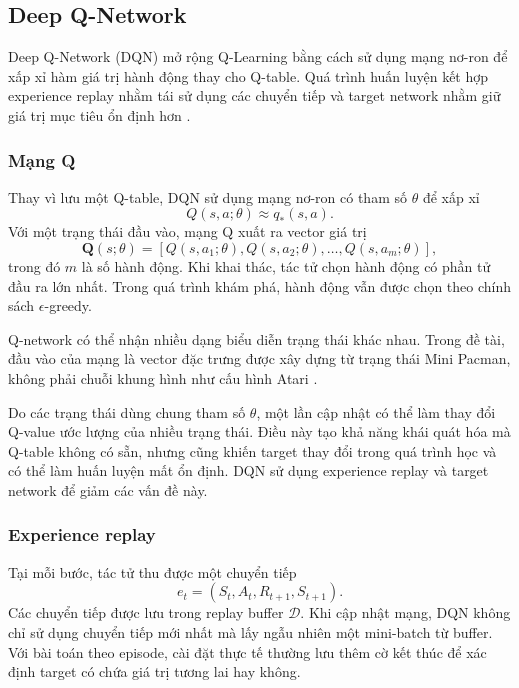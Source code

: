 \subsection{Deep Q-Network}

Deep Q-Network (DQN) mở rộng Q-Learning bằng cách sử dụng mạng nơ-ron để xấp xỉ hàm giá trị hành động thay cho Q-table. Quá trình huấn luyện kết hợp experience replay nhằm tái sử dụng các chuyển tiếp và target network nhằm giữ giá trị mục tiêu ổn định hơn \cite{Mnih2013,Mnih2015}.

\subsubsection{Mạng Q}

Thay vì lưu một Q-table, DQN sử dụng mạng nơ-ron có tham số $\theta$ để xấp xỉ
\begin{equation}
    Q(s,a;\theta)
    \approx
    q_{*}(s,a).
    \label{eq:q-network-approximation}
\end{equation}
Với một trạng thái đầu vào, mạng Q xuất ra vector giá trị
\begin{equation}
    \mathbf{Q}(s;\theta)
    =
    \left[
        Q(s,a_1;\theta),
        Q(s,a_2;\theta),
        \ldots,
        Q(s,a_m;\theta)
    \right],
    \label{eq:q-network-output}
\end{equation}
trong đó $m$ là số hành động. Khi khai thác, tác tử chọn hành động có phần tử đầu ra lớn nhất. Trong quá trình khám phá, hành động vẫn được chọn theo chính sách $\epsilon$-greedy.

Q-network có thể nhận nhiều dạng biểu diễn trạng thái khác nhau. Trong đề tài, đầu vào của mạng là vector đặc trưng được xây dựng từ trạng thái Mini Pacman, không phải chuỗi khung hình như cấu hình Atari \cite{Mnih2013,Mnih2015}.

Do các trạng thái dùng chung tham số $\theta$, một lần cập nhật có thể làm thay đổi Q-value ước lượng của nhiều trạng thái. Điều này tạo khả năng khái quát hóa mà Q-table không có sẵn, nhưng cũng khiến target thay đổi trong quá trình học và có thể làm huấn luyện mất ổn định. DQN sử dụng experience replay và target network để giảm các vấn đề này.

\subsubsection{Experience replay}

Tại mỗi bước, tác tử thu được một chuyển tiếp
\begin{equation}
    e_t
    =
    (S_t,A_t,R_{t+1},S_{t+1}).
    \label{eq:transition}
\end{equation}
Các chuyển tiếp được lưu trong replay buffer $\mathcal{D}$. Khi cập nhật mạng, DQN không chỉ sử dụng chuyển tiếp mới nhất mà lấy ngẫu nhiên một mini-batch từ buffer. Với bài toán theo episode, cài đặt thực tế thường lưu thêm cờ kết thúc để xác định target có chứa giá trị tương lai hay không.

